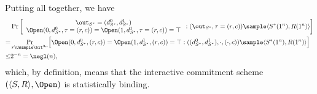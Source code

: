 \begin{answer}[c]
    Putting all together, we have
    \begin{align*}
        &\Pr\left[ \begin{array}{c}
             \out_{S^\ast}=(d^0_{S^\ast},d^1_{S^\ast})  \\
             \Open(0,d^0_{S^\ast},\tau=(r,c)) = \Open(1,d^1_{S^\ast},\tau=(r,c))=\top
        \end{array} : (\out_{S^\ast} , \tau=(r,c))\sample \langle S^\ast(1^n), R(1^n)\rangle \right]\\
        =& \Pr_{r\Usample\bit^{3n}}\Bigr[\Open(0,d^0_{S^\ast},(r,c)) = \Open(1,d^1_{S^\ast},(r,c))=\top : ((d^0_{S^\ast}, d^1_{S^\ast}), \cdot , (\cdot,c))\sample \langle S^\ast(1^n), R(1^n)\rangle \Bigr]\\
        \le& 2^{-n} =\negl(n),
    \end{align*}
    which, by definition, means that the interactive commitment scheme $(\langle S, R\rangle, \Open)$ is statistically binding.
\end{answer}







